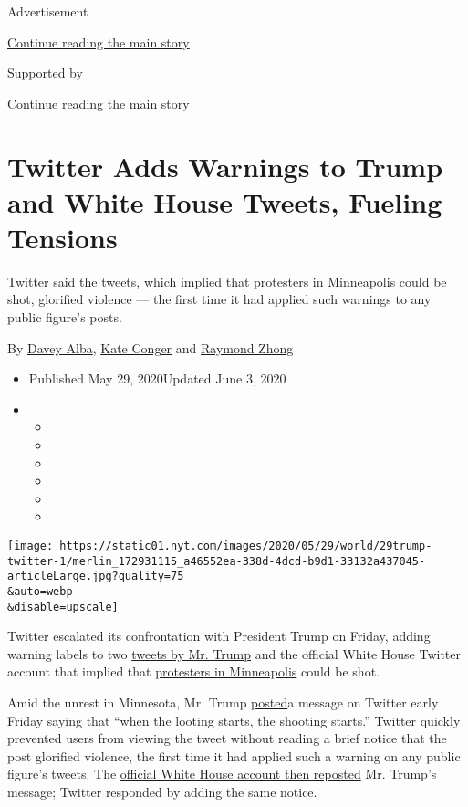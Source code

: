 Advertisement

\protect\hyperlink{after-top}{Continue reading the main story}

Supported by

\protect\hyperlink{after-sponsor}{Continue reading the main story}

\hypertarget{twitter-adds-warnings-to-trump-and-white-house-tweets-fueling-tensions}{%
\section{Twitter Adds Warnings to Trump and White House Tweets, Fueling
Tensions}\label{twitter-adds-warnings-to-trump-and-white-house-tweets-fueling-tensions}}

Twitter said the tweets, which implied that protesters in Minneapolis
could be shot, glorified violence --- the first time it had applied such
warnings to any public figure's posts.

By \href{https://www.nytimes.com/by/davey-alba}{Davey Alba},
\href{https://www.nytimes.com/by/kate-conger}{Kate Conger} and
\href{https://www.nytimes.com/by/raymond-zhong}{Raymond Zhong}

\begin{itemize}
\item
  Published May 29, 2020Updated June 3, 2020
\item
  \begin{itemize}
  \item
  \item
  \item
  \item
  \item
  \item
  \end{itemize}
\end{itemize}

\texttt{[image: https://static01.nyt.com/images/2020/05/29/world/29trump-twitter-1/merlin\_172931115\_a46552ea-338d-4dcd-b9d1-33132a437045-articleLarge.jpg?quality=75\\\&auto=webp\\\&disable=upscale]}

Twitter escalated its confrontation with President Trump on Friday,
adding warning labels to two
\href{https://www.nytimes.com/2020/06/03/us/politics/trump-twitter-fact-check.html}{tweets
by Mr. Trump} and the official White House Twitter account that implied
that
\href{https://www.nytimes.com/2020/05/30/us/george-floyd-minneapolis.html}{protesters
in Minneapolis} could be shot.

Amid the unrest in Minnesota, Mr. Trump
\href{https://twitter.com/realDonaldTrump/status/1266231100780744704}{posted}a
message on Twitter early Friday saying that ``when the looting starts,
the shooting starts.'' Twitter quickly prevented users from viewing the
tweet without reading a brief notice that the post glorified violence,
the first time it had applied such a warning on any public figure's
tweets. The
\href{https://twitter.com/WhiteHouse/status/1266342941649506304}{official
White House account then reposted} Mr. Trump's message; Twitter
responded by adding the same notice.

